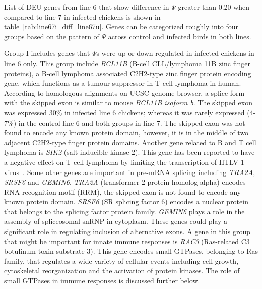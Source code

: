 \documentclass[10pt]{article}
\begin{document}
List of DEU genes from line 6 that show difference in $\Psi$ greater than 0.20 when compared to line 7
in infected chickens is shown in table~\ref{tab:line67i_diff_line67u}.
Genes can be categorized roughly into four groups based on the pattern of $\Psi$ across control and
infected birds in both lines.

Group I includes genes that $\Psi$s were up or down regulated in infected chickens in line 6 only.
This group include \textit{BCL11B} (B-cell CLL/lymphoma 11B zinc finger proteins), a B-cell lymphoma
associated C2H2-type zinc finger protein encoding gene, which functions as a tumour-suppressor
in T-cell lymphoma in human.
According to homologous alignments on UCSC genome browser, a splice form with the skipped exon
is similar to mouse \textit{BCL11B isoform b}.
The skipped exon was expressed 30\% in infected line 6 chickens; whereas it was rarely expressed
(4-7\%) in the control line 6 and both groups in line 7.
The skipped exon was not found to encode any known protein domain, however, it is in the middle of
two adjacent C2H2-type finger protein domains.
Another gene related to B and T cell lymphoma is \textit{SIK2} (salt-inducible kinase 2).
This gene has been reported to have a negative effect on T cell lymphoma by limiting the transcription of
HTLV-1 virus~\cite{tang2013lkb1}.
Some other genes are important in pre-mRNA splicing including \textit{TRA2A}, \textit{SRSF6} and \textit{GEMIN6}.
\textit{TRA2A} (transformer-2 protein homolog alpha) encodes RNA recognition motif (RRM),
the skipped exon is not found to encode any known protein domain.
\textit{SRSF6} (SR splicing factor 6) encodes a nuclear protein that belongs to the splicing factor protein family.
\textit{GEMIN6} plays a role in the assembly of spliceosomal snRNP in cytoplasm.
These genes could play a significant role in regulating inclusion of alternative exons.
A gene in this group that might be important for innate immune responses is \textit{RAC3} (Ras-related C3
botulinum toxin substrate 3).
This gene encodes small GTPases, belonging to Ras family, that regulates a wide variety of cellular events
including cell growth, cytoskeletal reorganization and the activation of protein kinases.
The role of small GTPases in immune responses is discussed further below.
\end{document}
